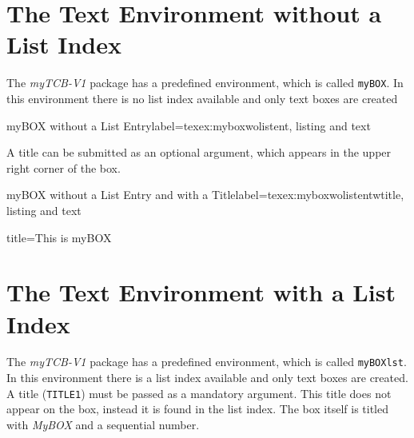 \documentclass[]{myHOWTO-V001}
\begin{document}
%
%

\section{The Text Environment without a List Index}

The \emph{myTCB-V1} package has a predefined environment, which is called \Verb|myBOX|. In this environment there is no list index available and only text boxes are created

\begin{myTEXEXdoclst}{myBOX without a List Entry}{label={texex:myboxwolistent}, listing and text}
\begin{myBOX}{}
	\lipsum[3]
\end{myBOX}
\end{myTEXEXdoclst}

A title can be submitted as an optional argument, which appears in the upper right corner of the box.

\begin{myTEXEXdoclst}{myBOX without a List Entry and with a Title}{label={texex:myboxwolistentwtitle}, listing and text}
\begin{myBOX}{title={This is myBOX}}
	\lipsum[4]
\end{myBOX}
\end{myTEXEXdoclst}

%
%

\section{The Text Environment with a List Index}

The \emph{myTCB-V1} package has a predefined environment, which is called \Verb|myBOXlst|. In this environment there is a list index available and only text boxes are created. A title (\verb|TITLE1|) must be passed as a mandatory argument. This title does not appear on the box, instead it is found in the list index. The box itself is titled with \emph{MyBOX} and a sequential number.
\end{document}
